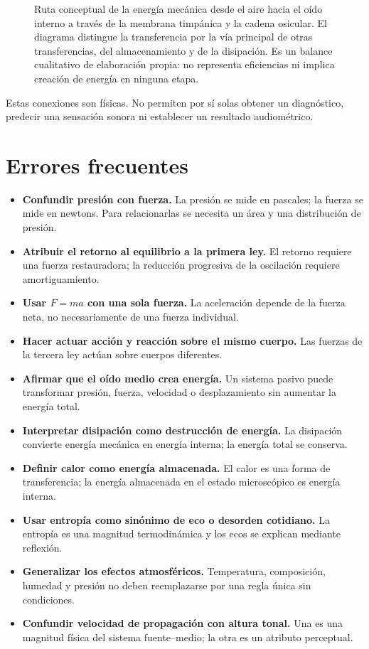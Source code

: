 \begin{figure}[ht]
    \centering
    
    \caption{Ruta conceptual de la energía mecánica desde el aire hacia el oído
    interno a través de la membrana timpánica y la cadena osicular. El diagrama
    distingue la transferencia por la vía principal de otras transferencias,
    del almacenamiento y de la disipación. Es un balance cualitativo de
    elaboración propia: no representa eficiencias ni implica creación de
    energía en ninguna etapa.}
    \label{fig:u2-balance-energia-auditiva}
\end{figure}

Estas conexiones son físicas. No permiten por sí solas obtener un diagnóstico, predecir una sensación sonora ni establecer un resultado audiométrico.

\section{Errores frecuentes}
\label{sec:u2-errores}

\begin{itemize}
    \item \textbf{Confundir presión con fuerza.} La presión se mide en pascales; la fuerza se mide en newtons. Para relacionarlas se necesita un área y una distribución de presión.
    \item \textbf{Atribuir el retorno al equilibrio a la primera ley.} El retorno requiere una fuerza restauradora; la reducción progresiva de la oscilación requiere amortiguamiento.
    \item \textbf{Usar \(F=ma\) con una sola fuerza.} La aceleración depende de la fuerza neta, no necesariamente de una fuerza individual.
    \item \textbf{Hacer actuar acción y reacción sobre el mismo cuerpo.} Las fuerzas de la tercera ley actúan sobre cuerpos diferentes.
    \item \textbf{Afirmar que el oído medio crea energía.} Un sistema pasivo puede transformar presión, fuerza, velocidad o desplazamiento sin aumentar la energía total.
    \item \textbf{Interpretar disipación como destrucción de energía.} La disipación convierte energía mecánica en energía interna; la energía total se conserva.
    \item \textbf{Definir calor como energía almacenada.} El calor es una forma de transferencia; la energía almacenada en el estado microscópico es energía interna.
    \item \textbf{Usar entropía como sinónimo de eco o desorden cotidiano.} La entropía es una magnitud termodinámica y los ecos se explican mediante reflexión.
    \item \textbf{Generalizar los efectos atmosféricos.} Temperatura, composición, humedad y presión no deben reemplazarse por una regla única sin condiciones.
    \item \textbf{Confundir velocidad de propagación con altura tonal.} Una es una magnitud física del sistema fuente--medio; la otra es un atributo perceptual.
\end{itemize}

